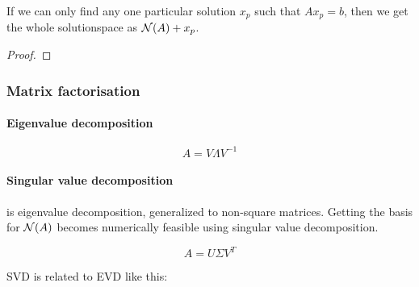 \begin{theorem}
  If we can only find any one particular solution $x_p$ such that $A x_p = b$, then we get the whole solutionspace as $\mathcal{N}(A) + x_p$.
\end{theorem}

\begin{proof}
\end{proof}





\subsubsection{Matrix factorisation}

\paragraph{Eigenvalue decomposition}

$$ A = V \Lambda V^{-1} $$

\paragraph{Singular value decomposition} is eigenvalue decomposition, generalized to non-square matrices.
Getting the basis for $\mathcal{N}(A)$ becomes numerically feasible using singular value decomposition.

$$ A = U \Sigma V^T $$

SVD is related to EVD like this: 

